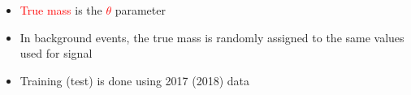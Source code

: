 {{    

    \vspace{0.3cm}

    \begin{itemize}
      \footnotesize
    \item \textcolor{red}{True mass} is the \textcolor{red}{$\theta$} parameter
    \item In background events, the true mass is randomly assigned to the same values used for signal
    \item Training (test) is done using 2017 (2018) data %
    \end{itemize}
  }    
}


